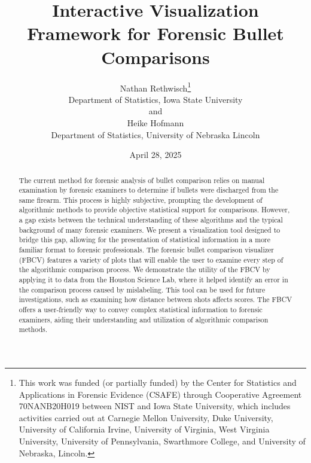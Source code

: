 \documentclass[
  12pt]{article}
\begin{document}
\def\spacingset#1{\renewcommand{\baselinestretch}%
{#1}\small\normalsize} \spacingset{1}



\date{April 28, 2025}
\title{\bf Interactive Visualization Framework for Forensic Bullet
Comparisons}
\author{
Nathan Rethwisch\thanks{This work was funded (or partially funded) by
the Center for Statistics and Applications in Forensic Evidence (CSAFE)
through Cooperative Agreement 70NANB20H019 between NIST and Iowa State
University, which includes activities carried out at Carnegie Mellon
University, Duke University, University of California Irvine, University
of Virginia, West Virginia University, University of Pennsylvania,
Swarthmore College, and University of Nebraska, Lincoln.}\\
Department of Statistics, Iowa State University\\
and\\Heike Hofmann\\
Department of Statistics, University of Nebraska Lincoln\\
}
\maketitle

\bigskip
\bigskip
\begin{abstract}
The current method for forensic analysis of bullet comparison relies on
manual examination by forensic examiners to determine if bullets were
discharged from the same firearm. This process is highly subjective,
prompting the development of algorithmic methods to provide objective
statistical support for comparisons. However, a gap exists between the
technical understanding of these algorithms and the typical background
of many forensic examiners. We present a visualization tool designed to
bridge this gap, allowing for the presentation of statistical
information in a more familiar format to forensic professionals. The
forensic bullet comparison visualizer (FBCV) features a variety of plots
that will enable the user to examine every step of the algorithmic
comparison process. We demonstrate the utility of the FBCV by applying
it to data from the Houston Science Lab, where it helped identify an
error in the comparison process caused by mislabeling. This tool can be
used for future investigations, such as examining how distance between
shots affects scores. The FBCV offers a user-friendly way to convey
complex statistical information to forensic examiners, aiding their
understanding and utilization of algorithmic comparison methods.
\end{abstract}
\end{document}
